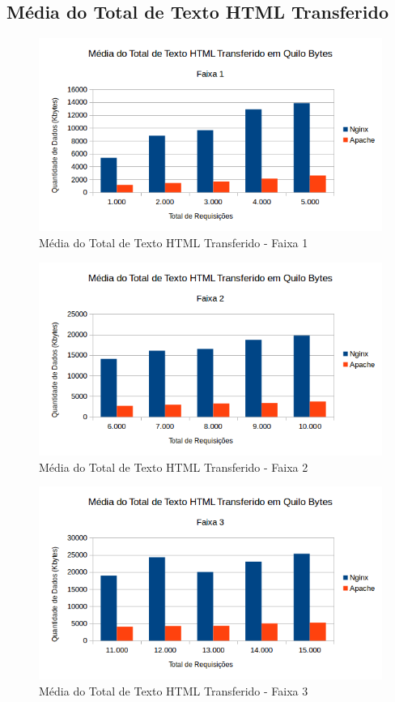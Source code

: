 \subsection{Média do Total de Texto HTML Transferido}
\begin{figure}[H]
	\centering
	\includegraphics[width=1\linewidth]{graficos/grafico3-f1} 
	\caption{Média do Total de Texto HTML Transferido - Faixa 1}
	\label{fig:grafico3-f1}
\end{figure}

\begin{figure}[H]
	\centering
	\includegraphics[width=1\linewidth]{graficos/grafico3-f2} 
	\caption{Média do Total de Texto HTML Transferido - Faixa 2}
	\label{fig:grafico3-f2}
\end{figure}

\begin{figure}[H]
	\centering
	\includegraphics[width=1\linewidth]{graficos/grafico3-f3} 
	\caption{Média do Total de Texto HTML Transferido - Faixa 3}
	\label{fig:grafico3-f3}
\end{figure}

